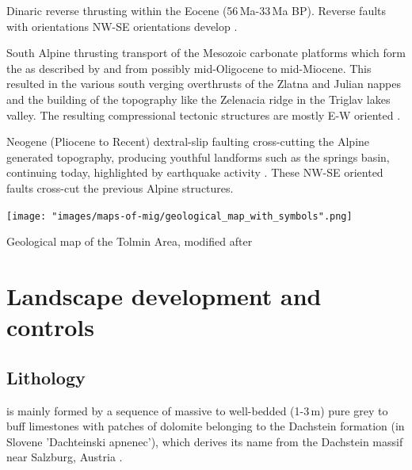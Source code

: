 \begin{citemize}
\item Dinaric reverse thrusting within the Eocene (56\,Ma-33\,Ma BP). Reverse faults with orientations NW-SE orientations develop  \citep{castellarin2000neo}.
\item South Alpine thrusting transport of the Mesozoic carbonate platforms which form the  as described by \citet{placer1998contribution} and \citet{buser1986tolmavc} from possibly mid-Oligocene to mid-Miocene. This resulted in the various south verging overthrusts of the Zlatna and Julian nappes and the building of the topography like the Zelenacia ridge in the Triglav lakes valley. The resulting compressional tectonic structures are mostly E-W oriented \citep{castellarin2000neo}.
\item Neogene (Pliocene to Recent) dextral-slip faulting cross-cutting the Alpine generated topography, producing youthful landforms such as the  springs basin, continuing today, highlighted by earthquake activity \citep{vsmuc2009tectonic,cunningham2006application}. These NW-SE oriented faults cross-cut the previous Alpine structures\citep{grenerczy2005tectonic}.
\end{citemize}

 \begin{map*}[t!]
 \checkoddpage \ifoddpage \forcerectofloat \else \forceversofloat \fi
\centering
  \texttt{[image: "images/maps-of-mig/geological\_map\_with\_symbols".png]}
  
  \caption{Geological map of the Tolmin Area, modified after \citet{buser1986tolmavc}}
  \label{map:mapofgeology}
 \end{map*}

\section{Landscape development and controls}
\subsection{Lithology}
\label{par:lithology}

 is mainly formed by a sequence of massive to well-bedded (1-3\,m) pure grey to buff limestones with patches of dolomite \citep{buser1986tolmavc} belonging to the Dachstein formation (in Slovene 'Dachteinski apnenec'), which derives its name from the Dachstein massif near Salzburg, Austria \citep{ogorelec1996dachstein}. 


